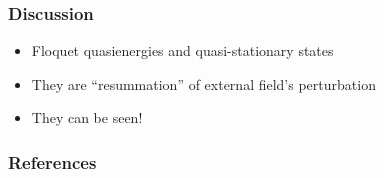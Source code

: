 \documentclass[t]{beamer}
\begin{document}
\endgroup

\begin{frame}
\frametitle{Discussion}

\begin{itemize}
    \item Floquet quasienergies and quasi-stationary states 
    \item They are ``resummation'' of external field's perturbation
    \item They can be seen!
\end{itemize}    

\end{frame}

\begin{frame}[allowframebreaks]
    \frametitle{References}

    \printbibliography

\end{frame}
\end{document}
